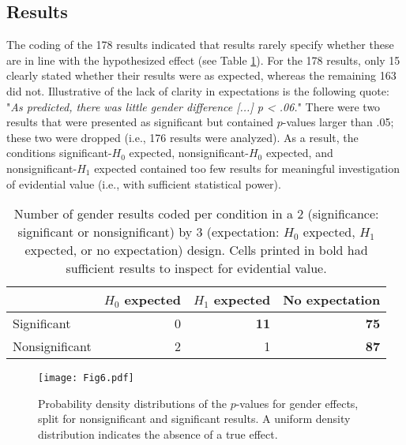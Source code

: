 \documentclass{article}
\begin{document}
\subsection*{Results}


The coding of the 178 results indicated that results rarely specify whether these are in line with the hypothesized effect (see Table \ref{tab:tab5}). For the 178 results, only 15 clearly stated whether their results were as expected, whereas the remaining 163 did not. Illustrative of the lack of clarity in expectations is the following quote: "\textit{As predicted, there was little gender difference [...] p < .06.}" There were two results that were presented as significant but contained $p$-values larger than .05; these two were dropped (i.e., 176 results were analyzed). As a result, the conditions significant-$H_0$ expected, nonsignificant-$H_0$ expected, and nonsignificant-$H_1$ expected contained too few results for meaningful investigation of evidential value (i.e., with sufficient statistical power).

\begin{table}[htbp]
\caption{Number of gender results coded per condition in a 2 (significance: significant or nonsignificant) by 3 (expectation: $H_0$ expected, $H_1$ expected, or no expectation) design. Cells printed in bold had sufficient results to inspect for evidential value.}
\centering
\begin{tabular}{lrrr}
& $H_0$ expected & $H_1$ expected & No expectation \\
\hline
Significant    & 0           & \textbf{11}          & \textbf{75}             \\
Nonsignificant & 2           & 1           & \textbf{87}     \\
\hline
\end{tabular}
\label{tab:tab5}
\end{table}

\begin{figure}
\begin{center}
\texttt{[image: Fig6.pdf]}
\end{center}
\caption{Probability density distributions of the $p$-values for gender effects, split for nonsignificant and significant results. A uniform density distribution indicates the absence of a true effect.}
\label{fig:fig6}
\end{figure}
\end{document}
